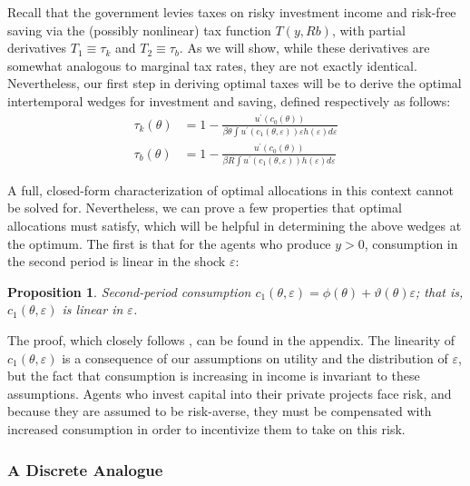 \documentclass[11pt]{article}
\newcommand{\p}{\prime}
\newtheorem{proposition}{Proposition}
\begin{document}
Recall that the government levies taxes on risky investment income and risk-free saving via the (possibly nonlinear) tax function \( T(y,Rb) \), with partial derivatives \( T_1 \equiv \tau_k \) and \( T_2\equiv\tau_b \). As we will show, while these derivatives are somewhat analogous to marginal tax rates, they are not exactly identical. Nevertheless, our first step in deriving optimal taxes will be to derive the optimal intertemporal wedges for investment and saving, defined respectively as follows:
\begin{align}
    \tau_k(\theta) &= 1 - \frac{u^\p\left( c_0(\theta) \right)}{\beta\theta\int u^\p\left( c_1(\theta,\varepsilon) \right)\varepsilon h(\varepsilon)d\varepsilon} \label{tau_k} \\
    \tau_b(\theta) &= 1 - \frac{u^\p\left( c_0(\theta) \right)}{\beta R\int u^\p\left( c_1(\theta,\varepsilon) \right) h(\varepsilon)d\varepsilon} \label{tau_b} 
\end{align}

A full, closed-form characterization of optimal allocations in this context cannot be solved for. Nevertheless, we can prove a few properties that optimal allocations must satisfy, which will be helpful in determining the above wedges at the optimum. The first is that for the agents who produce \( y>0 \), consumption in the second period is linear in the shock \( \varepsilon \):
%
\begin{proposition} \label{c1_lin}
    Second-period consumption \( c_1(\theta,\varepsilon) = \phi\left(\theta\right)+\vartheta\left(\theta\right)\varepsilon \); that is, \( c_1(\theta,\varepsilon) \) is linear in \( \varepsilon \).
\end{proposition}
%
The proof, which closely follows \cite{shourideh2014optimal}, can be found in the appendix. The linearity of \( c_1(\theta,\varepsilon) \) is a consequence of our assumptions on utility and the distribution of \( \varepsilon \), but the fact that consumption is increasing in income is invariant to these assumptions. Agents who invest capital into their private projects face risk, and because they are assumed to be risk-averse, they must be compensated with increased consumption in order to incentivize them to take on this risk. 

\subsubsection{A Discrete Analogue}
\end{document}
